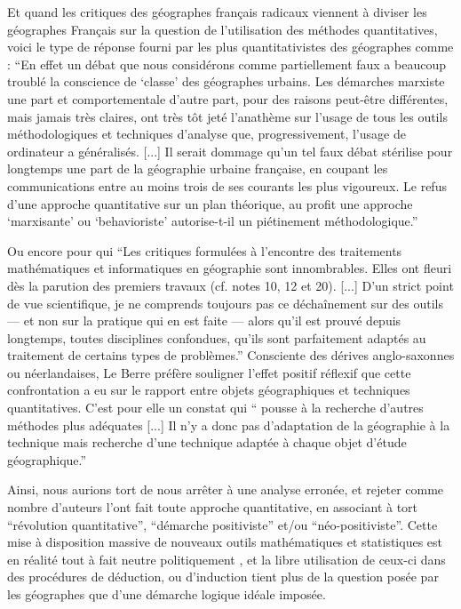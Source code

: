 Et quand les critiques des géographes français radicaux viennent à diviser les géographes Français sur la question de l'utilisation des méthodes quantitatives, voici le type de réponse fourni par les plus quantitativistes des géographes comme \textcite[337-338]{Pumain1983} : \enquote{En effet un débat que nous considérons comme partiellement faux a beaucoup troublé la conscience de \enquote{classe} des géographes urbains. Les démarches marxiste une part et comportementale d'autre part, pour des raisons peut-être différentes, mais jamais très claires, ont très tôt jeté l'anathème sur l'usage de tous les outils méthodologiques et techniques d'analyse que, progressivement, l'usage de ordinateur a généralisés. [...] Il serait dommage qu'un tel faux débat stérilise pour longtemps une part de la géographie urbaine française, en coupant les communications entre au moins trois de ses courants les plus vigoureux. Le refus d'une approche quantitative sur un plan théorique, au profit une approche \enquote{marxisante} ou \enquote{behavioriste} autorise-t-il un piétinement méthodologique.} 

Ou encore \textcite[11]{LeBerre1987} pour qui \enquote{Les critiques formulées à l'encontre des traitements mathématiques et informatiques en géographie sont innombrables. Elles ont fleuri dès la parution des premiers travaux (cf. notes 10, 12 et 20). [...] D'un strict point de vue scientifique, je ne comprends toujours pas ce déchaînement sur des outils — et non sur la pratique qui en est faite — alors qu'il est prouvé depuis longtemps, toutes disciplines confondues, qu'ils sont parfaitement adaptés au traitement de certains types de problèmes.} Consciente des dérives anglo-saxonnes ou néerlandaises, Le Berre préfère souligner l'effet positif réflexif que cette confrontation a eu sur le rapport entre objets géographiques et techniques quantitatives. C'est pour elle un constat qui \enquote{ pousse à la recherche d’autres méthodes plus adéquates [...] Il n’y a donc pas d’adaptation de la géographie à la technique mais recherche d'une technique adaptée à chaque objet d'étude géographique.}

Ainsi, nous aurions tort de nous arrêter à une analyse erronée, et rejeter comme nombre d'auteurs l'ont fait toute approche quantitative, en associant à tort \enquote{révolution quantitative}, \enquote{démarche positiviste} et/ou \enquote{néo-positiviste}. Cette mise à disposition massive de nouveaux outils mathématiques et statistiques est en réalité tout à fait neutre politiquement \autocite{Sheppard2001}, et la libre utilisation de ceux-ci dans des procédures de déduction, ou d'induction tient plus de la question posée par les géographes que d'une démarche logique idéale imposée. \autocite{Sanders2000}

